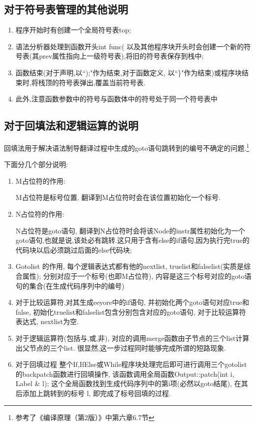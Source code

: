 \documentclass[UTF8]{article}
\begin{document}
\subsection{对于符号表管理的其他说明}
\begin{enumerate}[(1)]
\item 程序开始时有创建一个全局符号表top; 
\item 语法分析器处理到函数开头int func( 以及其他程序块开头时会创建一个新的符号表(其prev属性指向上一级符号表),将旧的符号表保存到栈中; 
\item 函数结束(对于声明,以``);"作为结束,对于函数定义, 以``\}"作为结束)或程序块结束时,将栈顶的符号表弹出,覆盖当前符号表. 
\item 此外,注意函数参数中的符号与函数体中的符号处于同一个符号表中
\end{enumerate}
\subsection{对于回填法和逻辑运算的说明}
回填法用于解决语法制导翻译过程中生成的goto语句跳转到的编号不确定的问题.\footnote{参考了《编译原理（第2版）》中第六章6.7节}

下面分几个部分说明:
\begin{enumerate}[(1)]
\item M占位符的作用: 

M占位符是标号位置, 翻译到M占位符时会在该位置初始化一个标号.
\item N占位符的作用:

N占位符是goto语句, 翻译到N占位符时会将该Node的instr属性初始化为一个goto语句,也就是说,该处必有跳转.这只用于含有else的if语句,因为执行完true的代码块以后必须跳过后面的else代码块;
\item Gotolist 的作用, 每个逻辑表达式都有他的nextlist, truelist和falselist(实质是综合属性);  分别对应于一个标号(也即M占位符), 内容是这三个标号对应的goto语句的集合(在生成代码序列中的编号)

\item 对于比较运算符,对其生成eeyore中的if语句, 并初始化两个goto语句对应true和false, 初始化truelist和falselist包含分别包含对应的goto语句, 对于比较运算符表达式, nextlist为空.

\item 对于逻辑运算符(包括与,或,非), 对应的调用merge函数由子节点的三个list计算出父节点的三个list. 很显然,这一步过程同时能够完成所谓的短路现象.

\item 对于回填过程 整个If,IfElse或While程序块处理完后即可进行调用三个gotolist的backpatch函数进行回填操作, 该函数调用全局函数Output::patch(int i, Label \& l);  这个全局函数找到生成代码序列中的第i项(必然以goto结尾), 在其后添加上跳转到的标号 l, 即完成了标号回填的过程.
\end{enumerate}
\end{document}
